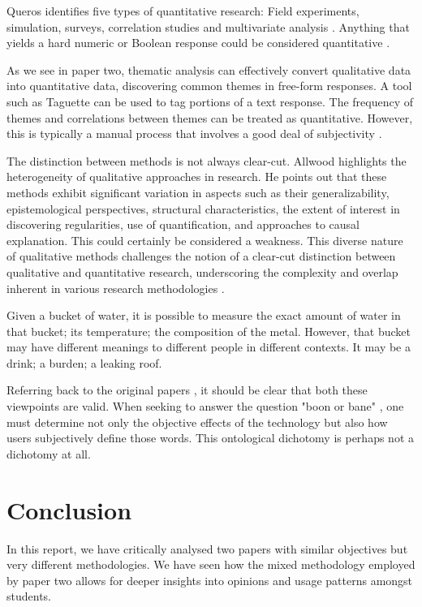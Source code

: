 \documentclass[12pt]{article}
\begin{document}
Queros identifies five types of quantitative research: Field experiments, simulation, surveys, correlation studies and multivariate analysis \cite{queros}. Anything that yields a hard numeric or Boolean response could be considered quantitative \cite{allwood}.

As we see in paper two, thematic analysis can effectively convert qualitative data into quantitative data, discovering common themes in free-form responses. A tool such as Taguette \cite{taguette} can be used to tag portions of a text response. The frequency of themes and correlations between themes can be treated as quantitative. However, this is typically a manual process that involves a good deal of subjectivity \cite{allwood}.

The distinction between methods is not always clear-cut. Allwood highlights the heterogeneity of qualitative approaches in research. He points out that these methods exhibit significant variation in aspects such as their generalizability, epistemological perspectives, structural characteristics, the extent of interest in discovering regularities, use of quantification, and approaches to causal explanation. This could certainly be considered a weakness. This diverse nature of qualitative methods challenges the notion of a clear-cut distinction between qualitative and quantitative research, underscoring the complexity and overlap inherent in various research methodologies \cite{allwood}.

Given a bucket of water, it is possible to measure the exact amount of water in that bucket; its temperature; the composition of the metal. However, that bucket may have different meanings to different people in different contexts. It may be a drink; a burden; a leaking roof.

Referring back to the original papers \cite{paper1, paper2}, it should be clear that both these viewpoints are valid. When seeking to answer the question "boon or bane" \cite{paper1}, one must determine not only the objective effects of the technology but also how users subjectively define those words. This ontological dichotomy is perhaps not a dichotomy at all. 

\section{Conclusion}

In this report, we have critically analysed two papers with similar objectives but very different methodologies. We have seen how the mixed methodology employed by paper two allows for deeper insights into opinions and usage patterns amongst students. 
\end{document}

